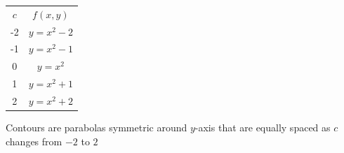 \documentclass[12pt,letterpaper, onecolumn]{exam}
\begin{document}
\begin{questions}
\begin{solution}
\begin{center}
				\begin{tabular}{ c c  }
					$c$& $f(x,y)$\\
					-2 & $y=x^2-2$ \\
					-1 & $y=x^2-1$ \\
					0 & $y=x^2$ \\
					1 & $y=x^2+1$ \\
					2 & $y=x^2+2$ \\
				\end{tabular}
			\end{center}
			Contours are parabolas symmetric around $y$-axis that are equally spaced as $c$ changes from $-2$ to $2$\\
		\end{solution}
		

\end{questions}
\end{document}
